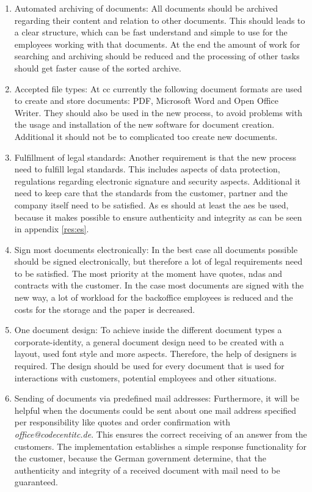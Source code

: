 \begin{enumerate}
	 \item Automated archiving of documents: \newline
	 All documents should be archived regarding their content and relation to other documents. This should leads to a clear structure, which can be fast understand and simple to use for the employees working with that documents. At the end the amount of work for searching and archiving should be reduced and the processing of other tasks should get faster cause of the sorted archive.
	 \item Accepted file types: \newline
	 At \gls{cc} currently the following document formats are used to create and store documents: \gls{PDF}, Microsoft Word and Open Office Writer. They should also be used in the new process, to avoid problems with the usage and installation of the new software for document creation. Additional it should not be to complicated too create new documents.
	 \item Fulfillment of legal standards: \newline
	 Another requirement is that the new process need to fulfill legal standards. This includes aspects of data protection, regulations regarding electronic signature and security aspects. Additional it need to keep care that the standards from the customer, partner and the company itself need to be satisfied. \newline
	 As \gls{es} should at least the \gls{aes} be used, because it makes possible to ensure authenticity and integrity as can be seen in appendix \ref{res:es}.
	 \item Sign most documents electronically: \newline
	 In the best case all documents possible should be signed electronically, but therefore a lot of legal requirements need to be satisfied. The most priority at the moment have quotes, \glspl{nda} and contracts with the customer. In the case most documents are signed with the new way, a lot of workload for the backoffice employees is reduced and the costs for the storage and the paper is decreased.
	 \item One document design: \newline
	 To achieve inside the different document types a corporate-identity, a general document design need to be created with a layout, used font style and more aspects. Therefore, the help of designers is required. The design should be used for every document that is used for interactions with customers, potential employees and other situations.
	 \item Sending of documents via predefined mail addresses: \newline
	 Furthermore, it will be helpful when the documents could be sent about one mail address specified per responsibility like quotes and order confirmation with \textit{office@codecentitc.de}. This ensures the correct receiving of an answer from the customers. The implementation establishes a simple response functionality for the customer, because the German government determine, that the authenticity and integrity of a received document with mail need to be guaranteed.
\end{enumerate}
